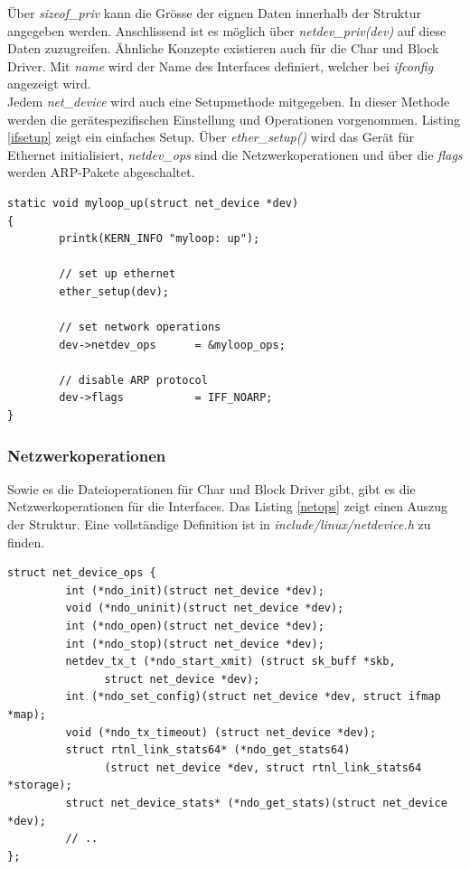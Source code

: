 Über \emph{sizeof\_priv} kann die Grösse der eignen Daten innerhalb der Struktur angegeben werden. Anschlissend ist es möglich über \emph{netdev\_priv(dev)} auf diese Daten zuzugreifen.
Ähnliche Konzepte existieren auch für die Char und Block Driver. Mit \emph{name} wird der Name des Interfaces definiert, welcher bei \emph{ifconfig} angezeigt wird. \\

Jedem \emph{net\_device} wird auch eine Setupmethode mitgegeben. In dieser Methode werden die gerätespezifischen Einstellung und Operationen vorgenommen. Listing \ref{ifsetup} zeigt
ein einfaches Setup. Über \emph{ether\_setup()} wird das Gerät für Ethernet initialisiert, \emph{netdev\_ops} sind die Netzwerkoperationen und über die \emph{flags} werden ARP-Pakete abgeschaltet.
\begin{lstlisting}[label=ifsetup,caption=Interface Setup]
static void myloop_up(struct net_device *dev)
{
        printk(KERN_INFO "myloop: up");

        // set up ethernet
        ether_setup(dev);

        // set network operations
        dev->netdev_ops      = &myloop_ops;

        // disable ARP protocol
        dev->flags           = IFF_NOARP;
}
\end{lstlisting}

\subsubsection{Netzwerkoperationen}

Sowie es die Dateioperationen für Char und Block Driver gibt, gibt es die Netzwerkoperationen für die Interfaces. Das Listing \ref{netops} zeigt einen
Auszug der Struktur. Eine vollständige Definition ist in \emph{include/linux/netdevice.h} zu finden. 
\begin{lstlisting}[label=netops,caption=Network Operations]
struct net_device_ops {
         int (*ndo_init)(struct net_device *dev);
         void (*ndo_uninit)(struct net_device *dev);
         int (*ndo_open)(struct net_device *dev);
         int (*ndo_stop)(struct net_device *dev);
         netdev_tx_t (*ndo_start_xmit) (struct sk_buff *skb, 
               struct net_device *dev);
         int (*ndo_set_config)(struct net_device *dev, struct ifmap *map);
         void (*ndo_tx_timeout) (struct net_device *dev);
         struct rtnl_link_stats64* (*ndo_get_stats64)
               (struct net_device *dev, struct rtnl_link_stats64 *storage);
         struct net_device_stats* (*ndo_get_stats)(struct net_device *dev);
         // ..
};
\end{lstlisting}

